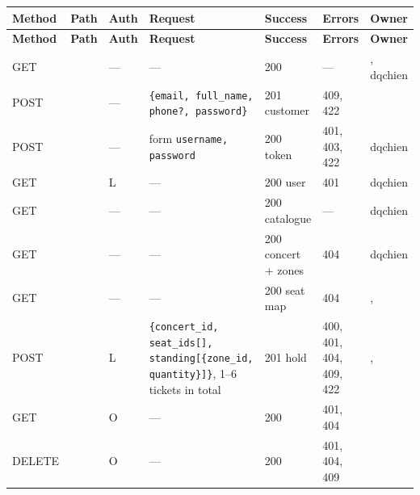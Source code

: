\documentclass[11pt,a4paper]{article}
\newcommand{\code}[1]{\begingroup\let\codeus\_\renewcommand{\_}{\codeus\allowbreak}\texttt{#1}\endgroup}
\begin{document}
{\scriptsize\setlength{\tabcolsep}{3pt}
\begin{xltabular}{\linewidth}{@{}l Y R{1.4cm} Y R{1.5cm} R{1.6cm} R{2.3cm}@{}}
\toprule
\bfseries Method & \bfseries Path & \bfseries Auth & \bfseries Request & \bfseries Success & \bfseries Errors & \bfseries Owner \\
\midrule
\endfirsthead
\toprule
\bfseries Method & \bfseries Path & \bfseries Auth & \bfseries Request & \bfseries Success & \bfseries Errors & \bfseries Owner \\
\midrule
\endhead
\bottomrule
\endfoot
GET    &                          & --- & ---                                      & 200 & ---           & , dqchien \\
POST   &                   & --- & \code{\{email, full\_name, phone?, password\}} & 201 customer & 409, 422 &  \\
POST   &                      & --- & form \code{username, password}           & 200 token & 401, 403, 422 & dqchien \\
GET    &                         & L   & ---                                      & 200 user  & 401           & dqchien \\
GET    &                        & --- & ---                                      & 200 catalogue & ---       & dqchien \\
GET    &                   & --- & ---                                      & 200 concert + zones & 404 & dqchien \\
GET    &             & --- & ---                                      & 200 seat map & 404        & ,  \\
POST   &                    & L   & \code{\{concert\_id, seat\_ids[], standing[\{zone\_id, quantity\}]\}}, 1--6 tickets in total & 201 hold  & 400, 401, 404, 409, 422 & ,  \\
GET    &               & O   & ---                                      & 200       & 401, 404      &  \\
DELETE &               & O   & ---                                      & 200       & 401, 404, 409 &  \\

\end{xltabular}}
\end{document}
